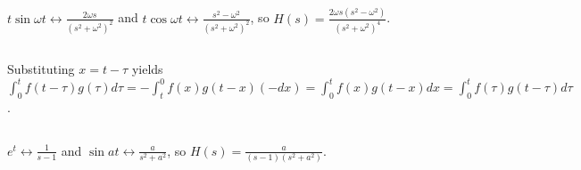 \documentclass{article}
\begin{document}
\subsection{}

$t \sin \omega t \leftrightarrow \frac{2 \omega s}{(s^2 + \omega^2)^2}$ and $t \cos \omega t \leftrightarrow \frac{s^2 - \omega^2}{(s^2 + \omega^2)^2}$, so $H(s) = \frac{2 \omega s (s^2 - \omega^2)}{(s^2 + \omega^2)^4}$.

\subsection{}

Substituting $x = t - \tau$ yields $\int_0^t f(t - \tau) g(\tau) d\tau = - \int_t^0 f(x) g(t - x)(-dx) = \int_0^t f(x) g(t - x)dx = \int_0^t f(\tau) g(t - \tau) d\tau$.

\subsection{}

$e^t \leftrightarrow \frac{1}{s - 1}$ and $\sin at \leftrightarrow \frac{a}{s^2 + a^2}$, so $H(s) = \frac{a}{(s - 1)(s^2 + a^2)}$.
\end{document}
